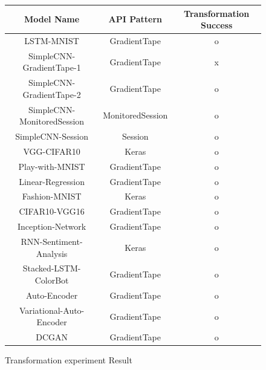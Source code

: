 \begin{figure}[!ht]
  \begin{center}
  \begin{tabular}{|c|c|c|}
    \hline
    Model Name & API Pattern & Transformation Success \\
    \hline
    LSTM-MNIST & GradientTape & o \\
    SimpleCNN-GradientTape-1 & GradientTape & x\\
    SimpleCNN-GradientTape-2 & GradientTape & o \\
    SimpleCNN-MonitoredSession & MonitoredSession &o\\
    SimpleCNN-Session & Session & o\\
    VGG-CIFAR10 & Keras & o \\ 
    Play-with-MNIST & GradientTape & o \\
    Linear-Regression & GradientTape & o \\
    Fashion-MNIST & Keras & o \\
    CIFAR10-VGG16 & GradientTape & o\\
    Inception-Network & GradientTape & o \\
    RNN-Sentiment-Analysis & Keras & o \\
    Stacked-LSTM-ColorBot & GradientTape & o \\
    Auto-Encoder & GradientTape & o \\
    Variational-Auto-Encoder & GradientTape & o \\
    DCGAN & GradientTape & o \\
    \hline
  \end{tabular}
  \end{center}
  \caption{Transformation experiment Result}
  \label{fig:eval:trans}
\end{figure}

